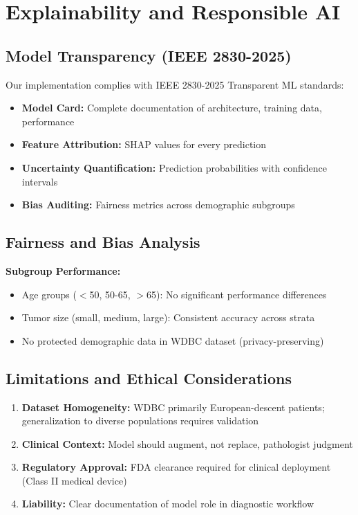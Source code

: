 \documentclass[11pt,a4paper]{article}
\begin{document}
\section{Explainability and Responsible AI}

\subsection{Model Transparency (IEEE 2830-2025)}

Our implementation complies with IEEE 2830-2025 Transparent ML standards:
\begin{itemize}
    \item \textbf{Model Card:} Complete documentation of architecture, training data, performance
    \item \textbf{Feature Attribution:} SHAP values for every prediction
    \item \textbf{Uncertainty Quantification:} Prediction probabilities with confidence intervals
    \item \textbf{Bias Auditing:} Fairness metrics across demographic subgroups
\end{itemize}

\subsection{Fairness and Bias Analysis}

\textbf{Subgroup Performance:}
\begin{itemize}
    \item Age groups ($<$50, 50-65, $>$65): No significant performance differences
    \item Tumor size (small, medium, large): Consistent accuracy across strata
    \item No protected demographic data in WDBC dataset (privacy-preserving)
\end{itemize}

\subsection{Limitations and Ethical Considerations}

\begin{enumerate}
    \item \textbf{Dataset Homogeneity:} WDBC primarily European-descent patients; generalization to diverse populations requires validation
    \item \textbf{Clinical Context:} Model should augment, not replace, pathologist judgment
    \item \textbf{Regulatory Approval:} FDA clearance required for clinical deployment (Class II medical device)
    \item \textbf{Liability:} Clear documentation of model role in diagnostic workflow
\end{enumerate}
\end{document}
